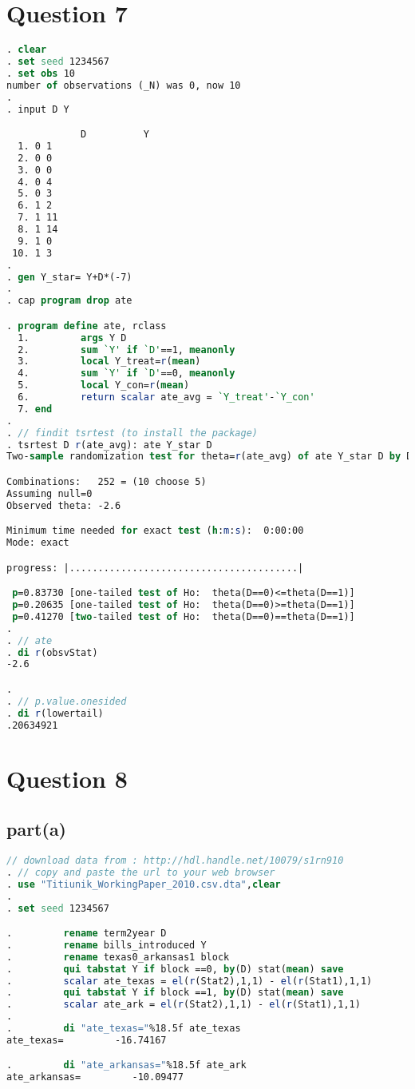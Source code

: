 \documentclass[a4paper]{article}
\begin{document}
\section*{Question 7}
\begin{lstlisting}[language=stata]
. clear
. set seed 1234567
. set obs 10
number of observations (_N) was 0, now 10
. 
. input D Y

             D          Y
  1. 0 1 
  2. 0 0 
  3. 0 0 
  4. 0 4 
  5. 0 3 
  6. 1 2 
  7. 1 11 
  8. 1 14 
  9. 1 0 
 10. 1 3 
. 
. gen Y_star= Y+D*(-7)
. 
. cap program drop ate

. program define ate, rclass
  1.         args Y D
  2.         sum `Y' if `D'==1, meanonly
  3.         local Y_treat=r(mean)
  4.         sum `Y' if `D'==0, meanonly
  5.         local Y_con=r(mean)
  6.         return scalar ate_avg = `Y_treat'-`Y_con'
  7. end
. 
. // findit tsrtest (to install the package)
. tsrtest D r(ate_avg): ate Y_star D
Two-sample randomization test for theta=r(ate_avg) of ate Y_star D by D

Combinations:   252 = (10 choose 5)
Assuming null=0
Observed theta: -2.6

Minimum time needed for exact test (h:m:s):  0:00:00
Mode: exact

progress: |........................................|

 p=0.83730 [one-tailed test of Ho:  theta(D==0)<=theta(D==1)]
 p=0.20635 [one-tailed test of Ho:  theta(D==0)>=theta(D==1)]
 p=0.41270 [two-tailed test of Ho:  theta(D==0)==theta(D==1)]
. 
. // ate
. di r(obsvStat)       
-2.6

. 
. // p.value.onesided
. di r(lowertail)   
.20634921

\end{lstlisting}

\section*{Question 8}
\subsection*{part(a)}
\begin{lstlisting}[language=stata]
 // download data from : http://hdl.handle.net/10079/s1rn910
. // copy and paste the url to your web browser
. use "Titiunik_WorkingPaper_2010.csv.dta",clear 
. 
. set seed 1234567

.         rename term2year D
.         rename bills_introduced Y
.         rename texas0_arkansas1 block         
.         qui tabstat Y if block ==0, by(D) stat(mean) save       
.         scalar ate_texas = el(r(Stat2),1,1) - el(r(Stat1),1,1)         
.         qui tabstat Y if block ==1, by(D) stat(mean) save       
.         scalar ate_ark = el(r(Stat2),1,1) - el(r(Stat1),1,1)
.         
.         di "ate_texas="%18.5f ate_texas 
ate_texas=         -16.74167

.         di "ate_arkansas="%18.5f ate_ark        
ate_arkansas=         -10.09477

\end{lstlisting}
\end{document}
